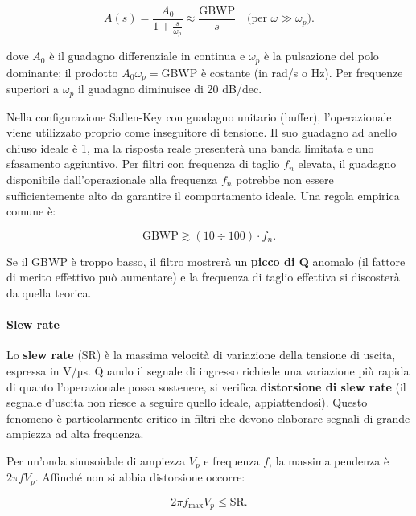 \begin{equation}
A(s) = \frac{A_0}{1 + \frac{s}{\omega_p}} \approx \frac{\text{GBWP}}{s} \quad \text{(per } \omega \gg \omega_p\text{)}.
\label{eq:opamp_polo_dominante}
\end{equation}

dove \(A_0\) è il guadagno differenziale in continua e \(\omega_p\) è la pulsazione del polo dominante; il prodotto \(A_0 \omega_p = \text{GBWP}\) è costante (in rad/s o Hz). Per frequenze superiori a \(\omega_p\) il guadagno diminuisce di 20 dB/dec.

Nella configurazione Sallen-Key con guadagno unitario (buffer), l'operazionale viene utilizzato proprio come inseguitore di tensione. Il suo guadagno ad anello chiuso ideale è 1, ma la risposta reale presenterà una banda limitata e uno sfasamento aggiuntivo. Per filtri con frequenza di taglio \(f_n\) elevata, il guadagno disponibile dall'operazionale alla frequenza \(f_n\) potrebbe non essere sufficientemente alto da garantire il comportamento ideale. Una regola empirica comune è:

\begin{equation}
\text{GBWP} \gtrsim (10 \div 100) \cdot f_n.
\label{eq:regola_gbwp}
\end{equation}

Se il GBWP è troppo basso, il filtro mostrerà un \textbf{picco di Q} anomalo (il fattore di merito effettivo può aumentare) e la frequenza di taglio effettiva si discosterà da quella teorica.

\paragraph{Slew rate}
Lo \textbf{slew rate} (SR) è la massima velocità di variazione della tensione di uscita, espressa in V/µs. Quando il segnale di ingresso richiede una variazione più rapida di quanto l'operazionale possa sostenere, si verifica \textbf{distorsione di slew rate} (il segnale d'uscita non riesce a seguire quello ideale, appiattendosi). Questo fenomeno è particolarmente critico in filtri che devono elaborare segnali di grande ampiezza ad alta frequenza.

Per un'onda sinusoidale di ampiezza \(V_p\) e frequenza \(f\), la massima pendenza è \(2\pi f V_p\). Affinché non si abbia distorsione occorre:

\begin{equation}
2\pi f_{\text{max}} V_p \le \text{SR}.
\label{eq:slew_rate}
\end{equation}


